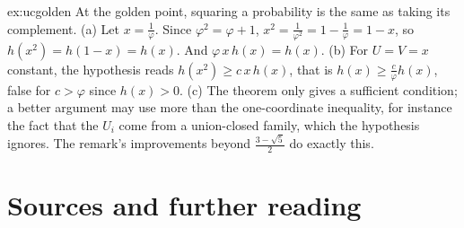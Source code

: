 \begin{solution}{ex:ucgolden}
\idea At the golden point, squaring a probability is the same as taking its complement.
\writeup (a) Let $x=\frac1\varphi$. Since $\varphi^2=\varphi+1$, $x^2=\frac1{\varphi^2}=1-\frac1\varphi=1-x$, so $h(x^2)=h(1-x)=h(x)$. And
$\varphi\,x\,h(x)=h(x)$. (b) For $U=V=x$ constant, the hypothesis reads $h(x^2)\ge c\,x\,h(x)$, that is $h(x)\ge\frac c\varphi h(x)$, false for $c>\varphi$
since $h(x)>0$. (c) The theorem only gives a sufficient condition; a better argument may use more than the one-coordinate inequality, for instance
the fact that the $U_i$ come from a union-closed family, which the hypothesis ignores. The remark's improvements beyond $\frac{3-\sqrt5}2$ do exactly this.
\end{solution}

\section*{Sources and further reading}

